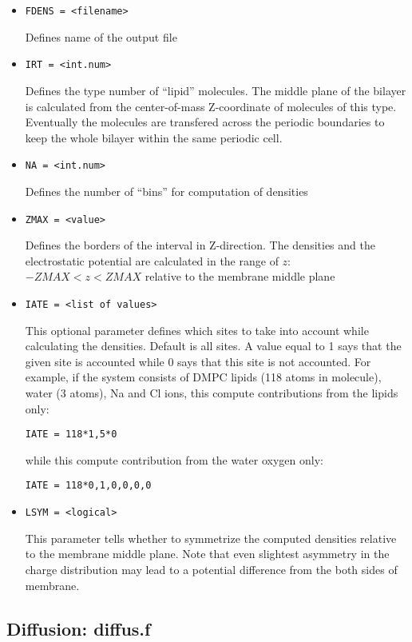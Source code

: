 \documentclass{article}
\begin{document}
\begin{itemize}

\item
\verb|FDENS = <filename>|

Defines name of the output file

\item
\verb|IRT = <int.num>|

Defines the type number of ``lipid'' molecules. The middle plane of the bilayer
is calculated from the center-of-mass Z-coordinate of molecules of 
this type. Eventually the molecules are transfered across the periodic 
boundaries to keep the whole bilayer within the same periodic cell.

\item
\verb|NA = <int.num>|

Defines the number of ``bins'' for computation of densities

\item
\verb|ZMAX = <value>|

Defines the borders of the interval in Z-direction. The densities and
the electrostatic potential are calculated in the range of $z$:
$-ZMAX < z < ZMAX$ relative to the membrane middle plane

\item
\verb|IATE = <list of values>|

This optional parameter defines which sites to take into account while
calculating the densities. Default is all sites. 
A value equal to 1 says that the given site is accounted while 0 says
that this site is not accounted. For example, if the 
system consists of DMPC lipids (118 atoms in molecule), water (3 atoms),
Na and Cl ions, this compute contributions from the lipids only:

\verb|IATE = 118*1,5*0|

while this compute contribution from the water oxygen only:
  
\verb|IATE = 118*0,1,0,0,0,0|

\item
\verb|LSYM = <logical>|

This parameter tells whether to symmetrize the computed densities 
relative to the membrane middle plane. Note that even slightest asymmetry
in the charge distribution may lead to a potential difference from the
both sides of membrane.

\end{itemize}

\subsection{Diffusion: diffus.f}
\end{document}
